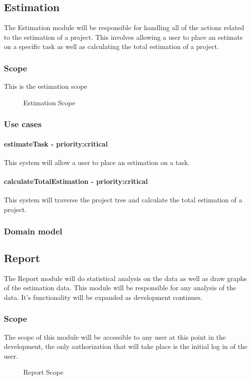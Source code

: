 \subsection{Estimation}
	The Estimation module will be responsible for handling all of the actions related to the estimation of a project. This involves allowing a user to place an estimate on a specific task as well as calculating the total estimation of a project.
\subsubsection{Scope}
	This is the estimation scope
	\begin{figure}[H]
	    	\centering
	    	\caption{Estimation Scope}
	    	\label{fig:Estimation_Scope}
   	\end{figure}
\subsubsection{Use cases}
	\paragraph{estimateTask - priority:critical}This system will allow a user to place an estimation on a task.
	\paragraph{calculateTotalEstimation - priority:critical}This system will traverse the project tree and calculate the total estimation of a project.
\subsubsection{Domain model}
\subsection{Report}
The Report module will do statistical analysis on the data as well as draw graphs of the estimation data. This module will be responsible for any analysis of the data. It's functionality will be expanded as development continues.
\subsubsection{Scope}
The scope of this module will be accessible to any user at this point in the development, the only authorization that will take place is the initial log in of the user.
	\begin{figure}[H]
	    	\centering
	    	\caption{Report Scope}
	    	\label{fig:Report_Scope.png}
   	\end{figure}
